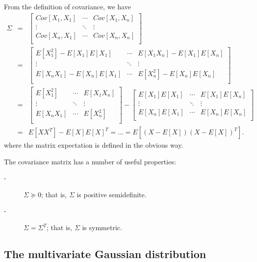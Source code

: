\documentclass{article}
\begin{document}
From the definition of covariance, we have
\begin{eqnarray*}
  \Sigma 
  &=&
  \begin{bmatrix}
    Cov[X_1,X_1] & \cdots & Cov[X_1,X_n] \\
    \vdots & \ddots & \vdots \\
    Cov[X_n,X_1] & \cdots & Cov[X_n,X_n] \\
  \end{bmatrix} \\
  &=&
  \begin{bmatrix}
    E[X_1^2] - E[X_1]E[X_1] & \cdots & E[X_1X_n] - E[X_1]E[X_n] \\
    \vdots & \ddots & \vdots \\
    E[X_nX_1] - E[X_n]E[X_1] & \cdots & E[X_n^2] - E[X_n]E[X_n] \\
  \end{bmatrix} \\
  &=&
  \begin{bmatrix}
    E[X_1^2] & \cdots & E[X_1X_n] \\
    \vdots & \ddots & \vdots \\
    E[X_nX_1] & \cdots & E[X_n^2] \\
  \end{bmatrix} -
  \begin{bmatrix}
    E[X_1]E[X_1] & \cdots & E[X_1]E[X_n] \\
    \vdots & \ddots & \vdots \\
    E[X_n]E[X_1] & \cdots & E[X_n]E[X_n] \\
  \end{bmatrix} \\
  &=& E[XX^T] - E[X]E[X]^T = \ldots = E[(X - E[X])(X - E[X])^T].
\end{eqnarray*}
where the matrix expectation is defined in the obvious way.

The covariance matrix has a number of useful properties:
\begin{description}
\item[-] $\Sigma \succeq 0$; that is, $\Sigma$ is positive semidefinite.
\item[-] $\Sigma = \Sigma^T$; that is, $\Sigma$ is symmetric.
\end{description}

\subsection{The multivariate Gaussian distribution}
\end{document}
